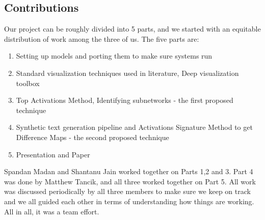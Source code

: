 \documentclass[10pt,twocolumn,letterpaper]{article}
\begin{document}
\subsection{Contributions}
Our project can be roughly divided into 5 parts, and we started with an equitable distribution of work among the three of us. The five parts are: 
\begin{enumerate}
\item Setting up models and porting them to make sure systems run
\item Standard visualization techniques used in literature, Deep visualization toolbox
\item Top Activations Method, Identifying subnetworks - the first proposed technique
\item Synthetic text generation pipeline and Activations Signature Method to get Difference Maps - the second proposed technique
\item Presentation and Paper
\end{enumerate}

Spandan Madan and Shantanu Jain worked together on Parts 1,2 and 3. Part 4 was done by Matthew Tancik, and all three worked together on Part 5. All work was discussed periodically by all three members to make sure we keep on track and we all guided each other in terms of understanding how things are working. All in all, it was a team effort.


{\small


}
\end{document}
